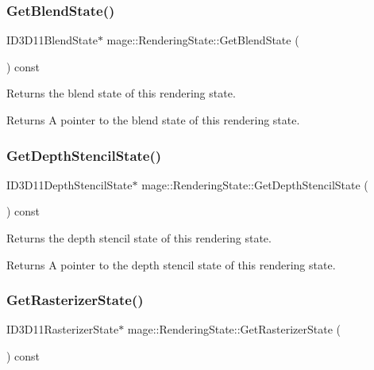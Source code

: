 \subsubsection{\texorpdfstring{Get\+Blend\+State()}{GetBlendState()}}
{\footnotesize\ttfamily I\+D3\+D11\+Blend\+State$\ast$ mage\+::\+Rendering\+State\+::\+Get\+Blend\+State (\begin{DoxyParamCaption}{ }\end{DoxyParamCaption}) const\hspace{0.3cm}{\ttfamily [noexcept]}}

Returns the blend state of this rendering state.

\begin{DoxyReturn}{Returns}
A pointer to the blend state of this rendering state. 
\end{DoxyReturn}
\hypertarget{structmage_1_1_rendering_state_a8a11db948fdf3c84bf55346877fcc020}{}\label{structmage_1_1_rendering_state_a8a11db948fdf3c84bf55346877fcc020} 
\subsubsection{\texorpdfstring{Get\+Depth\+Stencil\+State()}{GetDepthStencilState()}}
{\footnotesize\ttfamily I\+D3\+D11\+Depth\+Stencil\+State$\ast$ mage\+::\+Rendering\+State\+::\+Get\+Depth\+Stencil\+State (\begin{DoxyParamCaption}{ }\end{DoxyParamCaption}) const\hspace{0.3cm}{\ttfamily [noexcept]}}

Returns the depth stencil state of this rendering state.

\begin{DoxyReturn}{Returns}
A pointer to the depth stencil state of this rendering state. 
\end{DoxyReturn}
\hypertarget{structmage_1_1_rendering_state_a46b7f58a95f8029598d8354fdf02840f}{}\label{structmage_1_1_rendering_state_a46b7f58a95f8029598d8354fdf02840f} 
\subsubsection{\texorpdfstring{Get\+Rasterizer\+State()}{GetRasterizerState()}}
{\footnotesize\ttfamily I\+D3\+D11\+Rasterizer\+State$\ast$ mage\+::\+Rendering\+State\+::\+Get\+Rasterizer\+State (\begin{DoxyParamCaption}{ }\end{DoxyParamCaption}) const\hspace{0.3cm}{\ttfamily [noexcept]}}

